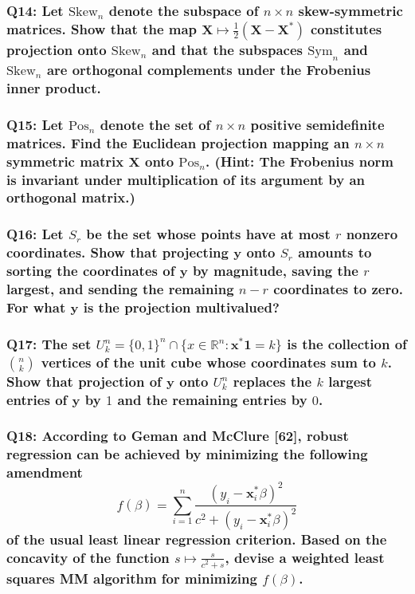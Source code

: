 \documentclass{article}
\begin{document}
\subsubsection*{Q14: Let \(\mathrm{Skew}_n\) denote the subspace of \(n \times n\) skew-symmetric matrices. Show that the map \(\mathbf{X} \mapsto \frac{1}{2} (\mathbf{X} - \mathbf{X}^*)\) constitutes projection onto \(\mathrm{Skew}_n\) and that the subspaces \(\mathrm{Sym}_n\) and \(\mathrm{Skew}_n\) are orthogonal complements under the Frobenius inner product.}

\subsubsection*{Q15: Let \(\mathrm{Pos}_n\) denote the set of \(n \times n\) positive semidefinite matrices. Find the Euclidean projection mapping an \(n \times n\) symmetric matrix \(\mathbf{X}\) onto \(\mathrm{Pos}_n\). (Hint: The Frobenius norm is invariant under multiplication of its argument by an orthogonal matrix.)}

\subsubsection*{Q16: Let \(S_r\) be the set whose points have at most \(r\) nonzero coordinates. Show that projecting \(\mathbf{y}\) onto \(S_r\) amounts to sorting the coordinates of \(\mathbf{y}\) by magnitude, saving the \(r\) largest, and sending the remaining \(n - r\) coordinates to zero. For what \(\mathbf{y}\) is the projection multivalued?}

\subsubsection*{Q17: The set \(U_k^n = \{0,1\}^n \cap \{x \in \mathbb{R}^n : \mathbf{x}^* \mathbf{1} = k\}\) is the collection of \(\binom{n}{k}\) vertices of the unit cube whose coordinates sum to \(k\). Show that projection of \(\mathbf{y}\) onto \(U_k^n\) replaces the \(k\) largest entries of \(\mathbf{y}\) by \(1\) and the remaining entries by \(0\).}

\subsubsection*{Q18: According to Geman and McClure [62], robust regression can be achieved by minimizing the following amendment
\[
f(\beta) = \sum_{i=1}^{n} \frac{(y_i - \mathbf{x}_i^* \beta)^2}{c^2 + (y_i - \mathbf{x}_i^* \beta)^2}
\]
of the usual least linear regression criterion. Based on the concavity of the function \(s \mapsto \frac{s}{c^2 + s}\), devise a weighted least squares MM algorithm for minimizing \(f(\beta)\).}
\end{document}
